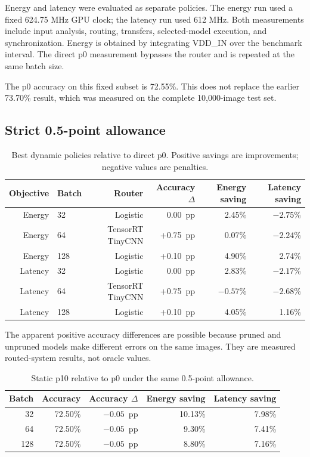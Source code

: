 \documentclass[11pt,a4paper]{article}
\newcommand{\pp}{~pp}
\begin{document}
Energy and latency were evaluated as separate policies. The energy run used a fixed 624.75 MHz GPU clock; the latency run used 612 MHz. Both measurements include input analysis, routing, transfers, selected-model execution, and synchronization. Energy is obtained by integrating VDD\_IN over the benchmark interval. The direct p0 measurement bypasses the router and is repeated at the same batch size.

The p0 accuracy on this fixed subset is 72.55\%. This does not replace the earlier 73.70\% result, which was measured on the complete 10,000-image test set.

\subsection{Strict 0.5-point allowance}

\begin{table}[H]
\centering
\small
\caption{Best dynamic policies relative to direct p0. Positive savings are improvements; negative values are penalties.}
\begin{tabular}{@{}rlrrrr@{}}
\toprule
Objective & Batch & Router & Accuracy $\Delta$ & Energy saving & Latency saving \\
\midrule
Energy & 32  & Logistic & 0.00\pp  & 2.45\% & $-2.75$\% \\
Energy & 64  & TensorRT TinyCNN & +0.75\pp & 0.07\% & $-2.24$\% \\
Energy & 128 & Logistic & +0.10\pp & 4.90\% & 2.74\% \\
Latency & 32  & Logistic & 0.00\pp & 2.83\% & $-2.17$\% \\
Latency & 64  & TensorRT TinyCNN & +0.75\pp & $-0.57$\% & $-2.68$\% \\
Latency & 128 & Logistic & +0.10\pp & 4.05\% & 1.16\% \\
\bottomrule
\end{tabular}
\label{tab:new-batch-routing}
\end{table}

The apparent positive accuracy differences are possible because pruned and unpruned models make different errors on the same images. They are measured routed-system results, not oracle values.

\begin{table}[H]
\centering
\small
\caption{Static p10 relative to p0 under the same 0.5-point allowance.}
\begin{tabular}{@{}rrrrr@{}}
\toprule
Batch & Accuracy & Accuracy $\Delta$ & Energy saving & Latency saving \\
\midrule
32  & 72.50\% & $-0.05$\pp & 10.13\% & 7.98\% \\
64  & 72.50\% & $-0.05$\pp & 9.30\% & 7.41\% \\
128 & 72.50\% & $-0.05$\pp & 8.80\% & 7.16\% \\
\bottomrule
\end{tabular}
\label{tab:static-p10}
\end{table}
\end{document}
